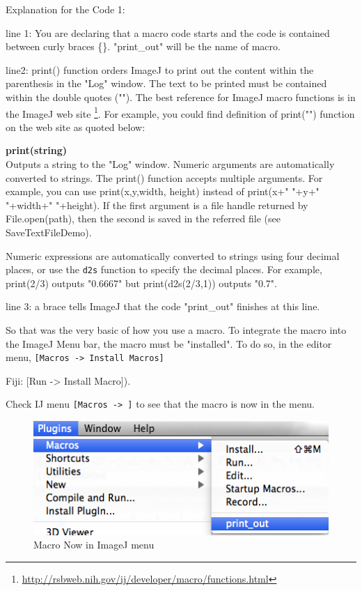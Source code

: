 \documentclass[11pt,a4paper,oneside]{report}
\newenvironment{indentFiji}%
{\begin{list}{}%
         {\setlength{\leftmargin}{1em}}%
         \item[]%
}
{\end{list}}
\newenvironment{indentCom}%
{\begin{list}{}%
         {\setlength{\leftmargin}{1em}}%
         \item[]%
}
{\end{list}}
\newcommand{\ijmenu}[1]{\texttt{\small#1}}
\newcommand{\ilcom}[1]{\texttt{\small#1}}
\begin{document}
Explanation for the Code 1:\\
\begin{itemize}
\item line 1: You are declaring that a macro code starts and the code is contained between 
curly braces \{\}. "print\_out" will be the name of macro. 

\item line2: print() function orders ImageJ to print out the content within the parenthesis 
in the "Log" window. The text to be printed must be contained within the double quotes (""). 
The best reference for ImageJ macro functions is in the ImageJ web site
\footnote{\url{http://rsbweb.nih.gov/ij/developer/macro/functions.html}}. 
For example, you could find definition of print("") function on the web site as quoted below:\\
\begin{indentCom}
\textbf{print(string)}\\
Outputs a string to the "Log" window. Numeric arguments are automatically converted to strings. 
The print() function accepts multiple arguments. For example, you can use print(x,y,width, height) 
instead of print(x+" "+y+" "+width+" "+height). 
If the first argument is a file handle returned by File.open(path), 
then the second is saved in the referred file (see SaveTextFileDemo).

Numeric expressions are automatically converted to strings using four decimal places, 
or use the \ilcom{d2s} function to specify the decimal places. 
For example, print(2/3) outputs "0.6667" but print(d2s(2/3,1)) outputs "0.7".
\end{indentCom}

\item line 3: a brace tells ImageJ that the code "print\_out" finishes at this line.  
\end{itemize}
So that was the very basic of how you use a macro. To integrate the macro into the ImageJ Menu bar, 
the macro must be "installed". To do so, in the editor menu, \ijmenu{[Macros -> Install Macros]} 
\begin{indentFiji}
Fiji: [Run -> Install Macro]).
\end{indentFiji}
Check IJ menu \ijmenu{[Macros -> ]} to see that the macro is now in the menu.\\


\begin{figure}[htbp]
\begin{center}
\includegraphics[scale=0.6]{fig/firstMacroInMenu.png}
\caption{Macro Now in ImageJ menu} \label{fig_MacroInMenu}
\end{center}
\end{figure}
\end{document}
